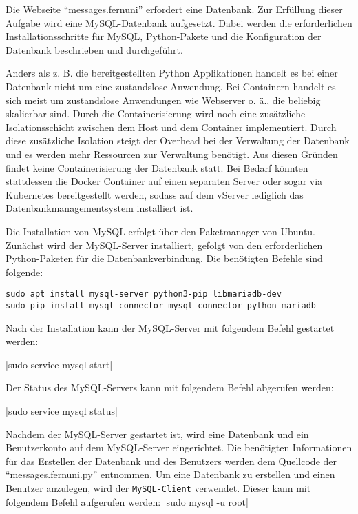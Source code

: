 Die Webseite \enquote{messages.fernuni} erfordert eine Datenbank. Zur Erfüllung dieser Aufgabe wird eine MySQL-Datenbank aufgesetzt. Dabei werden die erforderlichen Installationsschritte für MySQL, Python-Pakete und die Konfiguration der Datenbank beschrieben und durchgeführt.

Anders als z. B. die bereitgestellten Python Applikationen handelt es bei einer Datenbank nicht um eine zustandslose Anwendung. Bei Containern handelt es sich meist um zustandslose Anwendungen wie Webserver o. ä., die beliebig skalierbar sind. Durch die Containerisierung wird noch eine zusätzliche Isolationsschicht zwischen dem Host und dem Container implementiert. Durch diese zusätzliche Isolation steigt der Overhead bei der Verwaltung der Datenbank und es werden mehr Ressourcen zur Verwaltung benötigt. Aus diesen Gründen findet keine Containerisierung der Datenbank statt. Bei Bedarf könnten stattdessen die Docker Container auf einen separaten Server oder sogar via Kubernetes bereitgestellt werden, sodass auf dem vServer lediglich das Datenbankmanagementsystem installiert ist.

Die Installation von MySQL erfolgt über den Paketmanager von Ubuntu. Zunächst wird der MySQL-Server installiert, gefolgt von den erforderlichen Python-Paketen für die Datenbankverbindung. Die benötigten Befehle sind folgende:

\begin{verbatim}
sudo apt install mysql-server python3-pip libmariadb-dev
sudo pip install mysql-connector mysql-connector-python mariadb
\end{verbatim}

Nach der Installation kann der MySQL-Server mit folgendem Befehl gestartet werden:

|sudo service mysql start|

Der Status des MySQL-Servers kann mit folgendem Befehl abgerufen werden:

|sudo service mysql status|

Nachdem der MySQL-Server gestartet ist, wird eine Datenbank und ein Benutzerkonto auf dem MySQL-Server eingerichtet. Die benötigten Informationen für das Erstellen der Datenbank und des Benutzers werden dem Quellcode der \enquote{messages.fernuni.py} entnommen.
Um eine Datenbank zu erstellen und einen Benutzer anzulegen, wird der \verb+MySQL-Client+ verwendet. Dieser kann mit folgendem Befehl aufgerufen werden:
|sudo mysql -u root|

